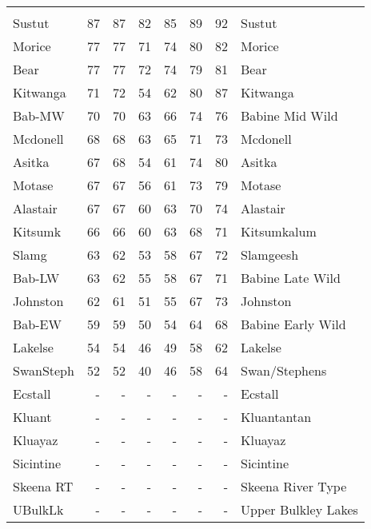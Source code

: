 \documentclass[french,11pt]{book}
\begin{document}
\begin{longtable}[t]{lrrrrrrl}
\midrule\\ Sustut & 87 & 87 & 82 & 85 & 89 & 92 & Sustut\\ Morice & 77 & 77 & 71 & 74 & 80 & 82 & Morice\\ Bear & 77 & 77 & 72 & 74 & 79 & 81 & Bear\\ Kitwanga & 71 & 72 & 54 & 62 & 80 & 87 & Kitwanga\\ Bab-MW & 70 & 70 & 63 & 66 & 74 & 76 & Babine Mid Wild\\ Mcdonell & 68 & 68 & 63 & 65 & 71 & 73 & Mcdonell\\ Asitka & 67 & 68 & 54 & 61 & 74 & 80 & Asitka\\ Motase & 67 & 67 & 56 & 61 & 73 & 79 & Motase\\ Alastair & 67 & 67 & 60 & 63 & 70 & 74 & Alastair\\ Kitsumk & 66 & 66 & 60 & 63 & 68 & 71 & Kitsumkalum\\ Slamg & 63 & 62 & 53 & 58 & 67 & 72 & Slamgeesh\\ Bab-LW & 63 & 62 & 55 & 58 & 67 & 71 & Babine Late Wild\\ Johnston & 62 & 61 & 51 & 55 & 67 & 73 & Johnston\\ Bab-EW & 59 & 59 & 50 & 54 & 64 & 68 & Babine Early Wild\\ Lakelse & 54 & 54 & 46 & 49 & 58 & 62 & Lakelse\\ SwanSteph & 52 & 52 & 40 & 46 & 58 & 64 & Swan/Stephens\\ Ecstall & - & - & - & - & - & - & Ecstall\\ Kluant & - & - & - & - & - & - & Kluantantan\\ Kluayaz & - & - & - & - & - & - & Kluayaz\\ Sicintine & - & - & - & - & - & - & Sicintine\\ Skeena RT & - & - & - & - & - & - & Skeena River Type\\ UBulkLk & - & - & - & - & - & - & Upper Bulkley Lakes\\* \end{longtable}

\endgroup{} \endgroup{}

\clearpage
\end{document}
